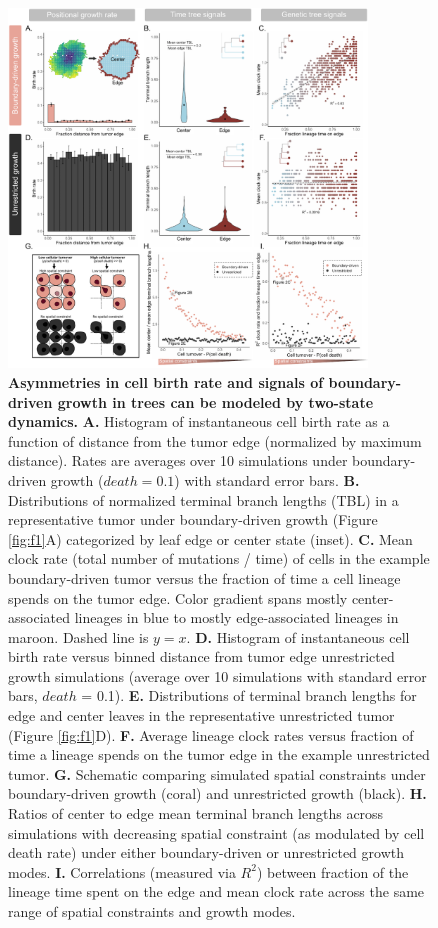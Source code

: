 \documentclass[12pt]{elife_based}
\begin{document}
\begin{figure}
    \centering
    \includegraphics[width=0.85\textwidth]{figures/fig2_ML_aff_ML2.pdf}


        \caption{\textbf{Asymmetries in cell birth rate and signals of boundary-driven growth in trees can be modeled by two-state dynamics.} \textbf{A.} Histogram of instantaneous cell birth rate as a function of distance from the tumor edge (normalized by maximum distance). Rates are averages over 10 simulations under boundary-driven growth ($death = 0.1$) with standard error bars. \textbf{B.} Distributions of normalized terminal branch lengths (TBL) in a representative tumor under boundary-driven growth (Figure \ref{fig:f1}A) categorized by leaf edge or center state (inset). \textbf{C.} Mean clock rate (total number of mutations / time) of cells in the example boundary-driven tumor versus the fraction of time a cell lineage spends on the tumor edge. Color gradient spans mostly center-associated lineages in blue to mostly edge-associated lineages in maroon. Dashed line is $y=x$. \textbf{D.} Histogram of instantaneous cell birth rate versus binned distance from tumor edge unrestricted growth simulations (average over 10 simulations with standard error bars, $death$ = 0.1). \textbf{E.} Distributions of terminal branch lengths for edge and center leaves in the representative unrestricted tumor (Figure \ref{fig:f1}D). \textbf{F.} Average lineage clock rates versus fraction of time a lineage spends on the tumor edge in the example unrestricted tumor. \textbf{G.} Schematic comparing simulated spatial constraints under boundary-driven growth (coral) and unrestricted growth (black).  
        \textbf{H.} Ratios of center to edge mean terminal branch lengths across simulations with decreasing spatial constraint (as modulated by cell death rate) under either boundary-driven or unrestricted growth modes. \textbf{I.} Correlations (measured via $R^2$) between fraction of the lineage time spent on the edge and mean clock rate across the same range of spatial constraints and growth modes.}
        \label{Fig2}
\end{figure}
\end{document}
